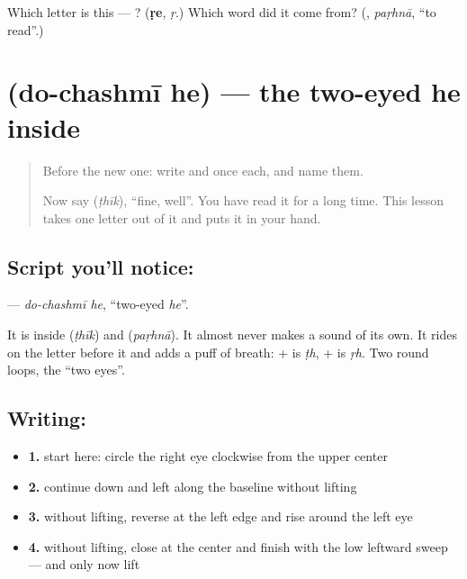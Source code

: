 \begin{tcolorbox}[breakable,colback=teal!4,colframe=teal!35!black,title={Before you move on}]
Which letter is this — ? (\textbf{ṛe}, \emph{ṛ}.) Which word did it come from? (\textbf{}, \emph{paṛhnā}, \textquotedblleft{}to read\textquotedblright{}.)
\end{tcolorbox}
\section[\texorpdfstring{\ur{ھ} (do-chashmī he)}{ھ (do-chashmī he)}]{ (do-chashmī he) — the two-eyed he inside }

\label{lesson:UR-W36-do-chashmi-he}



\begin{quote}
Before the new one: write  and  once each, and name them.

Now say \textbf{} (\emph{ṭhīk}), \textquotedblleft{}fine, well\textquotedblright{}. You have read it for a long time. This lesson takes one letter out of it and puts it in your hand.
\end{quote}

\subsection*{Script you'll notice: }
\textbf{} — \emph{do-chashmī he}, \textquotedblleft{}two-eyed \emph{he}\textquotedblright{}.

It is inside \textbf{} (\emph{ṭhīk}) and \textbf{} (\emph{paṛhnā}). It almost never makes a sound of its own. It rides on the letter before it and adds a puff of breath: \textbf{} + \textbf{} is \emph{ṭh}, \textbf{} + \textbf{} is \emph{ṛh}. Two round loops, the \textquotedblleft{}two eyes\textquotedblright{}.

\subsection*{Writing: }

\begin{itemize}
\raggedright
  \item \textbf{1.} start here: circle the right eye clockwise from the upper center
  \item \textbf{2.} continue down and left along the baseline without lifting
  \item \textbf{3.} without lifting, reverse at the left edge and rise around the left eye
  \item \textbf{4.} without lifting, close at the center and finish with the low leftward sweep — and only now lift
\end{itemize}

